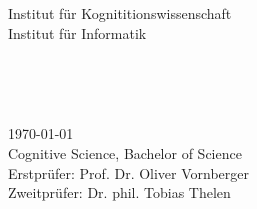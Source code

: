 \begin{titlepage}
\begin{addmargin}[-1cm]{-3cm}
\begin{center}
      Institut für Kognititionswissenschaft \\ \medskip
      Institut für Informatik

      \vfill

      \Large
       \\
      \bigskip

      \begingroup
        \LARGE
        \color{uos_red} \\
        \bigskip
      \endgroup

      \Large

      \vfill
      \vfill
    \end{center}

    \today \\
    Cognitive Science, Bachelor of Science \\
    Erstprüfer: Prof. Dr. Oliver Vornberger \\
    Zweitprüfer: Dr. phil. Tobias Thelen \\
  \end{addmargin}
\end{titlepage}
